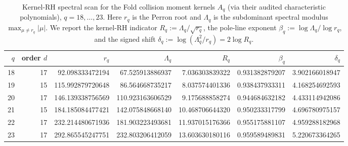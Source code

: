 \begin{table}[H]
\centering
\scriptsize
\setlength{\tabcolsep}{5pt}
\caption{Kernel-RH spectral scan for the Fold collision moment kernels $A_q$ (via their audited characteristic polynomials), $q=18,\dots,23$. Here $r_q$ is the Perron root and $\Lambda_q$ is the subdominant spectral modulus $\max_{\mu\ne r_q}|\mu|$. We report the kernel-RH indicator $R_q:=\Lambda_q/\sqrt{r_q}$, the pole-line exponent $\beta_q:=\log\Lambda_q/\log r_q$, and the signed shift $\delta_q:=\log(\Lambda_q^2/r_q)=2\log R_q$.}
\label{tab:fold_collision_kernel_rh_scan_q18_23}
\begin{tabular}{r r r r r r r}
\toprule
$q$ & order $d$ & $r_q$ & $\Lambda_q$ & $R_q$ & $\beta_q$ & $\delta_q$\\
\midrule
18 & 17 & 92.098333472194 & 67.525913886937 & 7.036303839322 & 0.931382879207 & 3.902166018947\\
19 & 15 & 115.992879720648 & 86.564668735217 & 8.037574401336 & 0.938437933311 & 4.168254692593\\
20 & 17 & 146.139338756569 & 110.923163606529 & 9.175688858274 & 0.944684632182 & 4.433114942086\\
21 & 15 & 184.185084477421 & 142.075848668140 & 10.468706644320 & 0.950233317799 & 4.696780975157\\
22 & 17 & 232.214480671936 & 181.903223493681 & 11.937015176366 & 0.955175881107 & 4.959288182968\\
23 & 17 & 292.865545247751 & 232.803206412059 & 13.603630180116 & 0.959589489831 & 5.220673364265\\
\bottomrule
\end{tabular}
\end{table}
